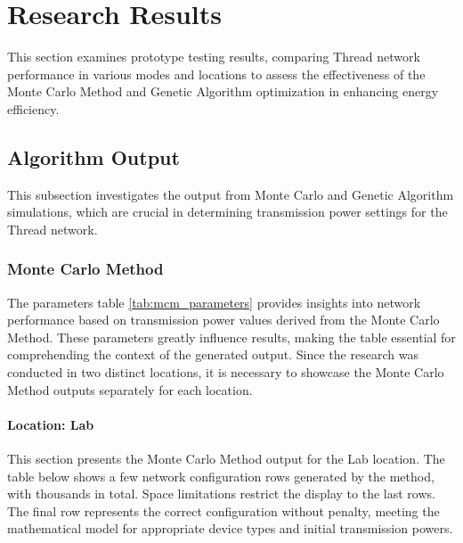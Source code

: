 \chapter{Research Results}\label{chap:research_results}

This section examines prototype testing results, comparing Thread network performance in various modes and locations to assess the effectiveness of the Monte Carlo Method and Genetic Algorithm optimization in enhancing energy efficiency.

\section{Algorithm Output}\label{sec:algorithm_output}
This subsection investigates the output from Monte Carlo and Genetic Algorithm simulations, which are crucial in determining transmission power settings for the Thread network.

\subsection{Monte Carlo Method}\label{sec:monte_carlo_method_output}
The parameters table \ref{tab:mcm_parameters} provides insights into network performance based on transmission power values derived from the Monte Carlo Method. These parameters greatly influence results, making the table essential for comprehending the context of the generated output. Since the research was conducted in two distinct locations, it is necessary to showcase the Monte Carlo Method outputs separately for each location.

\subsubsection{Location: Lab}\label{sec:monte_carlo_method_output_lab}
This section presents the Monte Carlo Method output for the Lab location. The table below shows a few network configuration rows generated by the method, with thousands in total. Space limitations restrict the display to the last rows. The final row represents the correct configuration without penalty, meeting the mathematical model for appropriate device types and initial transmission powers.

